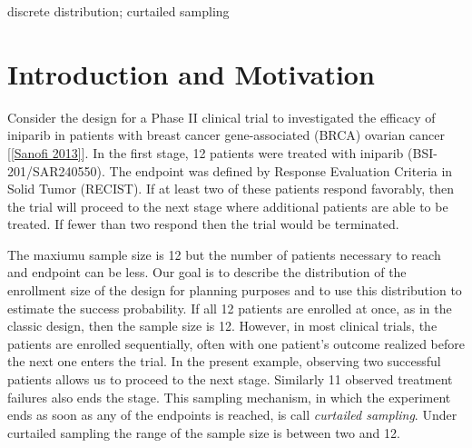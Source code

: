 \documentclass[12pt]{article}         %
\begin{document}
\bigskip

  discrete distribution; curtailed sampling


\thispagestyle{empty}
\setcounter{page}{1}

\section            {Introduction and Motivation}



Consider the design for a Phase II clinical trial to investigated the 
efficacy of iniparib in patients with breast cancer gene-associated (BRCA) 
ovarian cancer [\ref{Sanofi 2013}]. In the first stage, 12 patients were 
treated with iniparib (BSI-201/SAR240550). The endpoint was defined by 
Response Evaluation Criteria in Solid Tumor (RECIST). If at least two of
these patients respond favorably, then the trial will proceed to the next 
stage where additional patients are able to be treated. If fewer than two 
respond then the trial would be terminated. 

The maxiumu sample size is 12 but the number of patients necessary to 
reach and endpoint can be less. Our goal is to describe the distribution of 
the enrollment size of the design for 
planning purposes and to use this distribution to estimate the
success probability.  If all 12 patients are enrolled at once, 
as in the classic 
design, then the sample size is 12. However, in most clinical trials, the 
patients are enrolled sequentially, often with one patient's outcome realized 
before the next one enters the trial. In the present example, observing two 
successful patients allows us to proceed to the next stage. Similarly 11 
observed treatment failures also ends the stage. This sampling mechanism, in 
which the experiment ends as soon as any of the endpoints is reached, is 
call {\em curtailed sampling}. Under curtailed sampling the range of the 
sample size is between two and 12.
\end{document}
